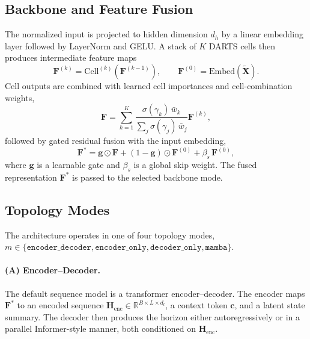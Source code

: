 \subsection{Backbone and Feature Fusion}
\label{sec:backbone}

The normalized input is projected to hidden dimension $d_h$ by a linear
embedding layer followed by LayerNorm and GELU. A stack of $K$ DARTS cells
then produces intermediate feature maps
%
\begin{equation}
    \mathbf{F}^{(k)} = \mathrm{Cell}^{(k)}\!\left(\mathbf{F}^{(k-1)}\right),
    \qquad
    \mathbf{F}^{(0)} = \mathrm{Embed}(\tilde{\mathbf{X}}).
    \label{eq:cells}
\end{equation}
%
Cell outputs are combined with learned cell importances and cell-combination
weights,
%
\begin{equation}
    \mathbf{F} = \sum_{k=1}^{K}
      \frac{\sigma(\gamma_k)\,\bar{w}_k}
           {\sum_j \sigma(\gamma_j)\,\bar{w}_j}
      \mathbf{F}^{(k)},
    \label{eq:cell_comb}
\end{equation}
%
followed by gated residual fusion with the input embedding,
%
\begin{equation}
    \mathbf{F}^* =
      \mathbf{g} \odot \mathbf{F} +
      (1 - \mathbf{g}) \odot \mathbf{F}^{(0)} +
      \beta_s\,\mathbf{F}^{(0)},
    \label{eq:gate}
\end{equation}
%
where $\mathbf{g}$ is a learnable gate and $\beta_s$ is a global skip weight.
The fused representation $\mathbf{F}^*$ is passed to the selected backbone
mode.

\subsection{Topology Modes}
\label{sec:topologies}

The architecture operates in one of four topology modes,
$m \in \{\texttt{encoder\_decoder},\texttt{encoder\_only},
\texttt{decoder\_only},\texttt{mamba}\}$.

\paragraph{(A) Encoder--Decoder.}
The default sequence model is a transformer encoder--decoder. The encoder
maps $\mathbf{F}^*$ to an encoded sequence
$\mathbf{H}_{\mathrm{enc}} \in \mathbb{R}^{B \times L \times d_l}$, a
context token $\mathbf{c}$, and a latent state summary. The decoder then
produces the horizon either autoregressively or in a parallel Informer-style
manner, both conditioned on $\mathbf{H}_{\mathrm{enc}}$.

